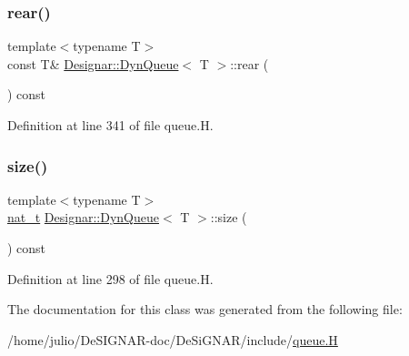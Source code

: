 \subsubsection{\texorpdfstring{rear()}{rear()}\hspace{0.1cm}{\footnotesize\ttfamily [2/2]}}
{\footnotesize\ttfamily template$<$typename T$>$ \\
const T\& \hyperlink{class_designar_1_1_dyn_queue}{Designar\+::\+Dyn\+Queue}$<$ T $>$\+::rear (\begin{DoxyParamCaption}{ }\end{DoxyParamCaption}) const\hspace{0.3cm}{\ttfamily [inline]}}



Definition at line 341 of file queue.\+H.

\mbox{\label{class_designar_1_1_dyn_queue_a3fa0e8fd7d197de1a60caae23b5c305e}} 
\subsubsection{\texorpdfstring{size()}{size()}}
{\footnotesize\ttfamily template$<$typename T$>$ \\
\hyperlink{namespace_designar_aa72662848b9f4815e7bf31a7cf3e33d1}{nat\+\_\+t} \hyperlink{class_designar_1_1_dyn_queue}{Designar\+::\+Dyn\+Queue}$<$ T $>$\+::size (\begin{DoxyParamCaption}{ }\end{DoxyParamCaption}) const\hspace{0.3cm}{\ttfamily [inline]}}



Definition at line 298 of file queue.\+H.



The documentation for this class was generated from the following file\+:\begin{DoxyCompactItemize}
\item 
/home/julio/\+De\+S\+I\+G\+N\+A\+R-\/doc/\+De\+Si\+G\+N\+A\+R/include/\hyperlink{queue_8_h}{queue.\+H}\end{DoxyCompactItemize}
